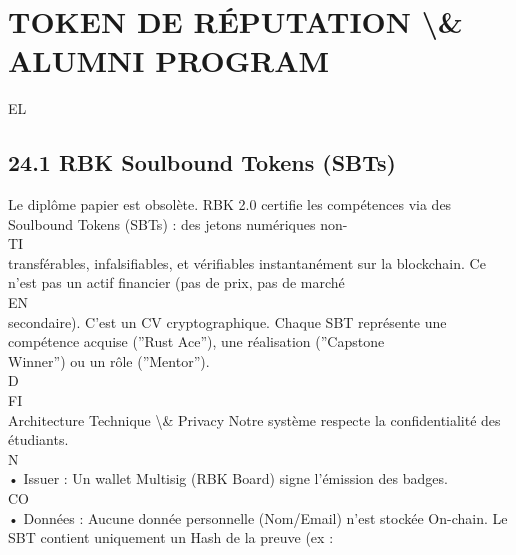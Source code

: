 \documentclass[12pt,landscape,a4paper]{article}
\begin{document}
\section{TOKEN DE RÉPUTATION \textbackslash{}& ALUMNI PROGRAM}
\vspace{0.5em}
\vspace{0.5em}
\vspace{0.5em}
\vspace{0.5em}
EL\\
\subsection{24.1 RBK Soulbound Tokens (SBTs)}
Le diplôme papier est obsolète. RBK 2.0 certifie les compétences via des Soulbound Tokens (SBTs) : des jetons numériques non-\\
\vspace{0.5em}
\vspace{0.5em}
\vspace{0.5em}
\vspace{0.5em}
TI\\
transférables, infalsifiables, et vérifiables instantanément sur la blockchain. Ce n’est pas un actif financier (pas de prix, pas de marché\\
\vspace{0.5em}
\vspace{0.5em}
\vspace{0.5em}
\vspace{0.5em}
EN\\
secondaire). C’est un CV cryptographique. Chaque SBT représente une compétence acquise (”Rust Ace”), une réalisation (”Capstone\\
Winner”) ou un rôle (”Mentor”).\\
\vspace{0.5em}
\vspace{0.5em}
\vspace{0.5em}
\vspace{0.5em}
D\\
FI\\
Architecture Technique \textbackslash{}& Privacy       Notre système respecte la confidentialité des étudiants.\\
\vspace{0.5em}
N\\
• Issuer : Un wallet Multisig (RBK Board) signe l’émission des badges.\\
CO\\
• Données : Aucune donnée personnelle (Nom/Email) n’est stockée On-chain. Le SBT contient uniquement un Hash de la preuve (ex :\\
\end{document}

